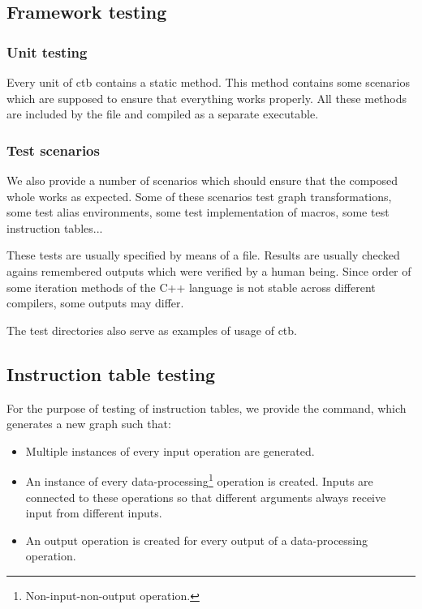 \subsection*{Framework testing}

\subsubsection{Unit testing}
Every unit of ctb contains a static  method. This method contains some scenarios which are supposed to ensure that everything works properly. All these methods are included by the  file and compiled as a separate executable.

\subsubsection{Test scenarios}
We also provide a number of scenarios which should ensure that the composed whole works as expected. Some of these scenarios test graph transformations, some test alias environments, some test implementation of macros, some test instruction tables...

These tests are usually specified by means of a  file. Results are usually checked agains remembered outputs which were verified by a human being. Since order of some iteration methods of the C++ language is not stable across different compilers, some outputs may differ.

The test directories also serve as examples of usage of ctb.

\subsection*{Instruction table testing}

For the purpose of testing of instruction tables, we provide the  command, which generates a new graph such that:
\begin{itemize}
  \item Multiple instances of every input operation are generated.
  \item An instance of every data-processing\footnote{Non-input-non-output operation.} operation is created. Inputs are connected to these operations so that different arguments always receive input from different inputs.
  \item An output operation is created for every output of a data-processing operation.
\end{itemize}

